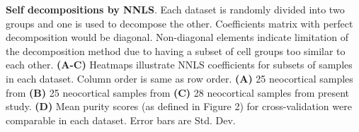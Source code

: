 \textbf{Self decompositions by NNLS}.
 Each dataset is randomly divided into two groups and one is used to decompose the other. Coefficients matrix with perfect decomposition would be diagonal. Non-diagonal elements indicate limitation of the decomposition method due to having a subset of cell groups too similar to each other. \textbf{(A-C)} Heatmaps illustrate NNLS coefficients for subsets of samples in each dataset. Column order is same as row order. \textbf{(A)} 25 neocortical samples from \cite{Tasic_2018} \textbf{(B)} 25 neocortical samples from \cite{Zeisel_2018} \textbf{(C)} 28 neocortical samples from present study. \textbf{(D)} Mean purity scores (as defined in Figure 2) for cross-validation were comparable in each dataset. Error bars are Std. Dev.
 
